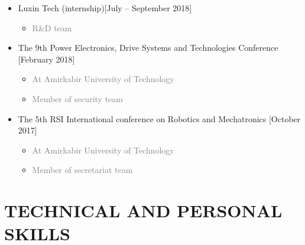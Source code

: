 \documentclass[10pt,a4paper,sans]{moderncv} %
\begin{document}
\begin{itemize}
		\item {} Luxin Tech (internship)\hfill [July -- September 2018]
			\begin{itemize}
							\item \textcolor{gray}{R\&D team}
			\end{itemize}				
			
		\item {} The 9th Power Electronics, Drive Systems and Technologies Conference \hfill [February 2018]
			\begin{itemize}
				\item \textcolor{gray}{At Amirkabir University of Technology}
				\item \textcolor{gray}{Member of security team}
			\end{itemize}			
			
		\item {} The 5th RSI International conference on Robotics and Mechatronics \hfill [October 2017]
			\begin{itemize}
				\item \textcolor{gray}{At Amirkabir University of Technology}
				\item \textcolor{gray}{Member of secretariat team}
			\end{itemize}
		\end{itemize}

	\section{TECHNICAL AND PERSONAL SKILLS}
	
\end{document}
